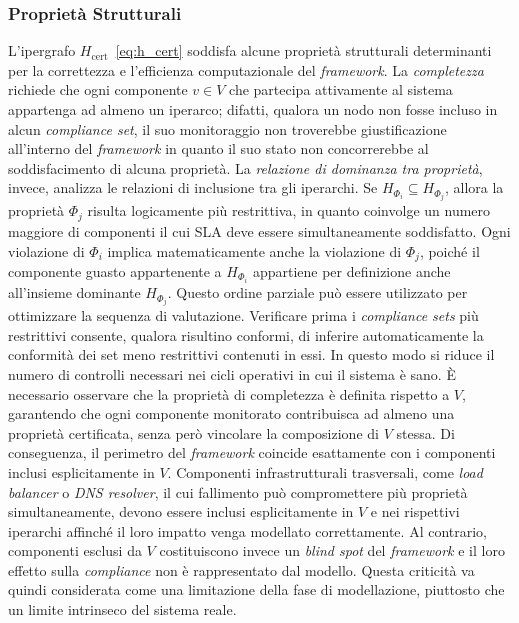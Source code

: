 \subsubsection{Proprietà Strutturali}
\label{sec:proprieta_strutturali}

L'ipergrafo $H_{\text{cert}}$~\eqref{eq:h_cert} soddisfa alcune proprietà strutturali determinanti per la
correttezza e l'efficienza computazionale del \textit{framework}. La \textit{completezza} richiede
che ogni componente $v \in V$ che partecipa attivamente al sistema appartenga ad almeno un
iperarco; difatti, qualora un nodo non fosse incluso in alcun \textit{compliance set}, il suo
monitoraggio non troverebbe giustificazione all'interno del \textit{framework} in quanto il suo
stato non concorrerebbe al soddisfacimento di alcuna proprietà. La \textit{relazione di dominanza
tra proprietà}, invece, analizza le relazioni di inclusione tra gli iperarchi. Se
$H_{\Phi_i} \subseteq H_{\Phi_j}$, allora la proprietà $\Phi_j$ risulta logicamente più
restrittiva, in quanto coinvolge un numero maggiore di componenti il cui \gls{SLA} deve essere
simultaneamente soddisfatto. Ogni violazione di $\Phi_i$ implica matematicamente anche la
violazione di $\Phi_j$, poiché il componente guasto appartenente a $H_{\Phi_i}$ appartiene per
definizione anche all'insieme dominante $H_{\Phi_j}$. Questo ordine parziale può essere utilizzato 
per ottimizzare la sequenza di valutazione. Verificare  prima i \textit{compliance sets} più restrittivi 
consente, qualora risultino conformi, di inferire automaticamente la conformità dei set meno restrittivi 
contenuti in essi. In questo modo si riduce il numero di controlli necessari nei cicli operativi in cui il sistema è sano.
È necessario osservare che la proprietà di completezza è definita rispetto a $V$, garantendo che
ogni componente monitorato contribuisca ad almeno una proprietà certificata, senza però vincolare
la composizione di $V$ stessa. Di conseguenza, il perimetro del \textit{framework} coincide
esattamente con i componenti inclusi esplicitamente in $V$. Componenti infrastrutturali trasversali,
come \textit{load balancer} o \textit{DNS resolver}, il cui fallimento può compromettere più
proprietà simultaneamente, devono essere inclusi esplicitamente in $V$ e nei rispettivi iperarchi
affinché il loro impatto venga modellato correttamente. Al contrario, componenti esclusi da $V$
costituiscono invece un \textit{blind spot} del \textit{framework} e il loro effetto sulla
\textit{compliance} non è rappresentato dal modello. Questa criticità va quindi considerata come
una limitazione della fase di modellazione, piuttosto che un limite intrinseco del sistema reale.

